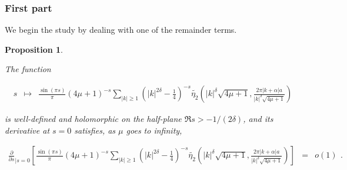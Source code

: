 \documentclass{jams-l}
\newtheorem{proposition}[theorem]{Proposition}
\theoremstyle{definition}
\theoremstyle{remark}
\numberwithin{equation}{section}
\begin{document}
        
        \subsubsection*{\textbf{First part}}
        \label{AFirstPart}
        
            We begin the study by dealing with one of the remainder terms.
            
            \begin{proposition}
            \label{PropA1}
            
                The function
                
                \[ \begin{array}{lll}
                        s & \longmapsto & \frac{\sin \left( \pi s \right)}{\pi} \left( 4 \mu + 1 \right)^{-s} \sum\limits_{\left \vert k \right \vert \geqslant 1} \left( \left \vert k \right \vert^{2 \delta} - \frac{1}{4} \right)^{-s} \widetilde{\eta_2} \left( \left \vert k \right \vert^{\delta} \sqrt{4 \mu + 1}, \frac{2 \pi \left \vert k + \alpha \right \vert a}{\left \vert k \right \vert^{\delta} \sqrt{4 \mu + 1}} \right)
                    \end{array} \]
                
                \noindent is well-defined and holomorphic on the half-plane $\Re s > - 1 / \left( 2 \delta \right)$, and its derivative at $s=0$ satisfies, as $\mu$ goes to infinity,
                
                \[ \begin{array}{lll}
                        \scriptstyle \frac{\partial}{\partial s}_{\left \vert s=0 \right.} \left[ \frac{\sin \left( \pi s \right)}{\pi} \left( 4 \mu + 1 \right)^{-s} \sum\limits_{\left \vert k \right \vert \geqslant 1} \left( \left \vert k \right \vert^{2 \delta} - \frac{1}{4} \right)^{-s} \widetilde{\eta_2} \left( \left \vert k \right \vert^{\delta} \sqrt{4 \mu + 1}, \frac{2 \pi \left \vert k + \alpha \right \vert a}{\left \vert k \right \vert^{\delta} \sqrt{4 \mu + 1}} \right) \right] & \scriptstyle = & \scriptstyle o \left( 1 \right)
                    \end{array} . \]
            
            \end{proposition}
            
\end{document}
